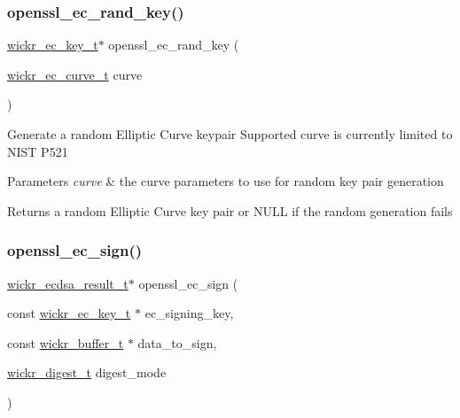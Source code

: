 \subsubsection{\texorpdfstring{openssl\+\_\+ec\+\_\+rand\+\_\+key()}{openssl\_ec\_rand\_key()}}
{\footnotesize\ttfamily \hyperlink{structwickr__ec__key}{wickr\+\_\+ec\+\_\+key\+\_\+t}$\ast$ openssl\+\_\+ec\+\_\+rand\+\_\+key (\begin{DoxyParamCaption}\item[{\hyperlink{structwickr__ec__curve}{wickr\+\_\+ec\+\_\+curve\+\_\+t}}]{curve }\end{DoxyParamCaption})}

Generate a random Elliptic Curve keypair Supported curve is currently limited to N\+I\+ST P521


\begin{DoxyParams}{Parameters}
{\em curve} & the curve parameters to use for random key pair generation \\
\hline
\end{DoxyParams}
\begin{DoxyReturn}{Returns}
a random Elliptic Curve key pair or N\+U\+LL if the random generation fails 
\end{DoxyReturn}
\mbox{\label{group__openssl__crypto_gab32cef5c789ee1992afae98a81b65823}} 
\subsubsection{\texorpdfstring{openssl\+\_\+ec\+\_\+sign()}{openssl\_ec\_sign()}}
{\footnotesize\ttfamily \hyperlink{structwickr__ecdsa__result}{wickr\+\_\+ecdsa\+\_\+result\+\_\+t}$\ast$ openssl\+\_\+ec\+\_\+sign (\begin{DoxyParamCaption}\item[{const \hyperlink{structwickr__ec__key}{wickr\+\_\+ec\+\_\+key\+\_\+t} $\ast$}]{ec\+\_\+signing\+\_\+key,  }\item[{const \hyperlink{structwickr__buffer}{wickr\+\_\+buffer\+\_\+t} $\ast$}]{data\+\_\+to\+\_\+sign,  }\item[{\hyperlink{structwickr__digest}{wickr\+\_\+digest\+\_\+t}}]{digest\+\_\+mode }\end{DoxyParamCaption})}

